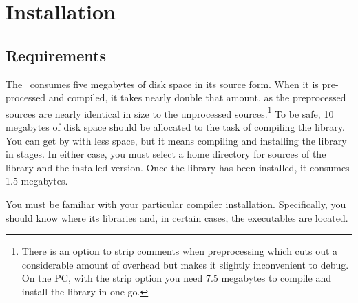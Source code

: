 %
%
%
%

\chapter{Installation}



\section{Requirements}

The \Library\ consumes five megabytes of disk space in its 
source form.
When it is pre-processed and compiled, it takes nearly double that amount,
as
the preprocessed sources are nearly identical in size to the unprocessed
sources.\footnote{There is an option to strip comments when 
	preprocessing which
	cuts out a considerable amount of overhead but makes 
	it slightly inconvenient 
	to debug.  On the PC, with the strip option you need 7.5 megabytes
	to compile and install the library in one go.}
To be safe, 10 megabytes of disk space should be allocated to the task
of compiling the library.  You can get by with less space, but it means
compiling and installing the library in stages.  In either case, you must select
a home directory for sources of the library and the installed version.
Once the library has been installed, it consumes 1.5
megabytes.

You must be familiar with your particular compiler installation. 
Specifically, you should know where its libraries and, in certain cases, 
the executables are located.  

